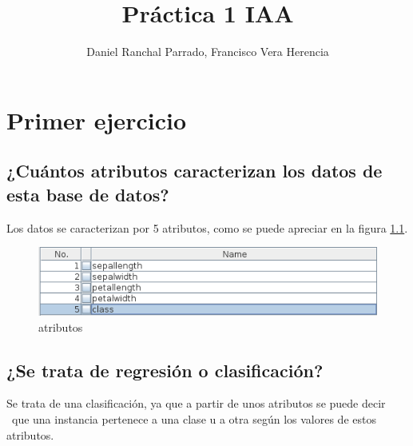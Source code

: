\documentclass[11pt,twoside,a4paper]{book}
\title{\Huge Práctica 1 IAA}
\author{Daniel Ranchal Parrado, Francisco Vera Herencia}
\date{\parbox{\linewidth}{\centering%
  \today\endgraf\bigskip
  32 horas de trabajo}}
\begin{document}
\maketitle
%
%

\renewcommand\bibname{Bibliografía}
\renewcommand\tablename{Tabla}

 \fancyhf{} \pagestyle{fancy}
\fancyhead[LO]{\rightmark} %
\fancyhead[RE]{\leftmark} %
\fancyhead[RO,LE]{\thepage} %
\setlength{\headheight}{14pt}
\renewcommand{\sectionmark}[1]{\markright{{\thesection. #1}}} %

\tableofcontents
\listoffigures

\chapter{Primer ejercicio}
\section{¿Cuántos atributos caracterizan los datos de esta base de datos?}
Los datos se caracterizan por 5 atributos, como se puede apreciar en la figura \ref{Fig1}.
\begin{figure}[H]
   \includegraphics[width=\textwidth]{attributes.png}
   \caption{atributos}
   \label{Fig1}
\end{figure}

\section{¿Se trata de regresión o clasificación?}
Se trata de una clasificación, ya que a partir de unos atributos se puede decir \
que una instancia pertenece a una clase u a otra según los valores de estos atributos.
\end{document}
